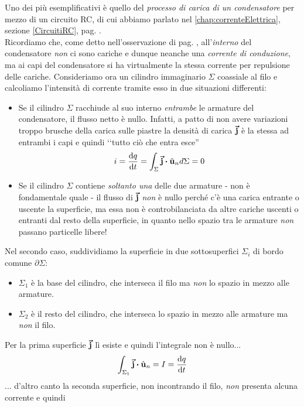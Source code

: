 Uno dei più esemplificativi è quello del \textit{processo di carica di un condensatore} per mezzo di un circuito RC, di cui abbiamo parlato nel \autoref{chap:correnteElettrica}, sezione \ref{CircuitiRC}, pag. \pageref{CircuitiRC}.\\
Ricordiamo che, come detto nell'osservazione di pag. \pageref{correntevariabile}, all'\textit{interno} del condensatore \textit{non} ci sono cariche e dunque neanche una \textit{corrente di conduzione}, ma ai capi del condensatore si ha virtualmente la stessa corrente per repulsione delle cariche. Consideriamo ora un cilindro immaginario $\Sigma$ coassiale al filo e calcoliamo l'intensità di corrente tramite esso in due situazioni differenti: 
\begin{itemize}
	\item Se il cilindro $\Sigma$ racchiude al suo interno \textit{entrambe} le armature del condensatore, il flusso netto è nullo. Infatti, a patto di non avere variazioni troppo brusche della carica sulle piastre la densità di carica $\vb*{\va{j}}$ è la stessa ad entrambi i capi e quindi ‘‘tutto ciò che entra esce''
	\begin{equation*}
		i=\dv{q}{t}=\int_{\Sigma}\vba{j}\vdot\vbh{u}_nd\Sigma=0
	\end{equation*} 
	\item Se il cilindro $\Sigma$ contiene \textit{soltanto una} delle due armature - non è fondamentale quale - il flusso di $\vb*{\va{j}}$ \textit{non} è nullo perché c'è una carica entrante o uscente la superficie, ma essa non è controbilanciata da altre cariche uscenti o entranti dal resto della superficie, in quanto nello spazio tra le armature \textit{non} passano particelle libere!
\end{itemize}
Nel secondo caso, suddividiamo la superficie in due sottosuperfici $\Sigma_i$ di bordo comune $\partial \Sigma$:
\begin{itemize}
	\item $\Sigma_1$ è la base del cilindro, che interseca il filo ma \textit{non} lo spazio in mezzo alle armature.
	\item $\Sigma_2$ è il resto del cilindro, che interseca lo spazio in mezzo alle armature ma \textit{non} il filo.
\end{itemize}
Per la prima superficie $\vb*{\va{j}}$ lì esiste e quindi l'integrale non è nullo...
\begin{equation*}
	\int_{\Sigma_1}\vba{j}\vdot\vbh{u}_n=I=\dv{q}{t}
\end{equation*}
... d'altro canto la seconda superficie, non incontrando il filo, \textit{non} presenta alcuna corrente e quindi
